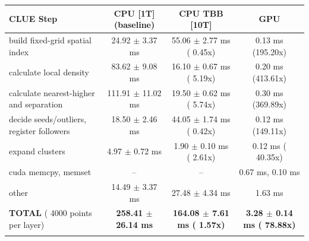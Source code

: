     \begin{tabular}{l|c|c|c}
    \hline
    CLUE Step                                 & CPU [1T] (baseline)         & CPU TBB [10T]                         & GPU                       \\ \hline
    build fixed-grid spatial index            &  24.92 $\pm$  3.37 ms       &  55.06 $\pm$  2.77 ms ( 0.45x)        &   0.13 ms (195.20x)       \\
    calculate local density                   &  83.62 $\pm$  9.08 ms       &  16.10 $\pm$  0.67 ms ( 5.19x)        &   0.20 ms (413.61x)       \\
    calculate nearest-higher and separation   & 111.91 $\pm$ 11.02 ms       &  19.50 $\pm$  0.62 ms ( 5.74x)        &   0.30 ms (369.89x)       \\
    decide seeds/outliers, register followers &  18.50 $\pm$  2.46 ms       &  44.05 $\pm$  1.74 ms ( 0.42x)        &   0.12 ms (149.11x)       \\
    expand clusters                           &   4.97 $\pm$  0.72 ms       &   1.90 $\pm$  0.10 ms ( 2.61x)        &   0.12 ms ( 40.35x)       \\ \hline
    cuda memcpy, memset                       & --                          & --                                    &   0.67 ms,   0.10 ms      \\
    other                                     &  14.49 $\pm$  3.37 ms       &  27.48 $\pm$  4.34 ms                 &   1.63 ms                 \\ \hline
    \textbf{TOTAL} ( 4000 points per layer)   & \textbf{258.41 $\pm$ 26.14 ms} & \textbf{164.08 $\pm$  7.61 ms ( 1.57x)} & \textbf{  3.28 $\pm$  0.14 ms ( 78.88x)}  \\
    \hline
    \multicolumn{4}{c}{}
    \end{tabular}
    \linebreak


